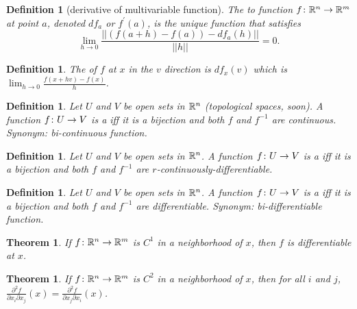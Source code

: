 \documentclass[11pt]{amsbook}
\theoremstyle{mystyle} %
\newtheorem{thrm}[thm]{Theorem}
\newtheorem{defi}[thm]{Definition}
\numberwithin{thm}{section}
\begin{document}
\begin{defi}[derivative of multivariable function]
	The  to function $f \colon {\mathbb R}^n \to {\mathbb R}^m$ at point $a$, denoted $df_a$ or $f^{\prime}(a)$, is the unique function that satisfies $$\lim_{h\to 0} \frac{||\left(f(a+h) - f(a)\right) - df_a(h)||}{||h||} = 0.$$
\end{defi}
\begin{defi}
	The  of $f$ at $x$ in the $v$ direction is $df_x(v)$ which is $\lim_{h\to 0} \frac{f(x+hv) - f(x)}{h}$.
\end{defi}
\begin{defi}
	Let $U$ and $V$ be open sets in ${\mathbb R}^n$ (topological spaces, soon).  A function $f\colon U\to V$ is a  iff it is a bijection and both $f$ and $f^{-1}$ are continuous.
	Synonym: bi-continuous function.
\end{defi}
\begin{defi}
	Let $U$ and $V$ be open sets in ${\mathbb R}^n$.  A function $f\colon U\to V$ is a  iff it is a bijection and both $f$ and $f^{-1}$ are $r$-continuously-differentiable.
\end{defi}
\begin{defi}
	Let $U$ and $V$ be open sets in ${\mathbb R}^n$.  A function $f\colon U\to V$ is a  iff it is a bijection and both $f$ and $f^{-1}$ are differentiable.
	Synonym: bi-differentiable function.
\end{defi}
\begin{thrm}
	If $f\colon {\mathbb R}^n \to {\mathbb R}^m$ is $C^1$ in a neighborhood of $x$, then $f$ is differentiable at $x$.
\end{thrm}
\begin{thrm}
	If $f\colon {\mathbb R}^n \to {\mathbb R}^m$ is $C^2$ in a neighborhood of $x$, then for all $i$ and $j$, $\frac{\partial^2f}{\partial x_i \partial x_j}(x) = \frac{\partial^2f}{\partial x_j \partial x_i}(x)$.
\end{thrm}
\end{document}
